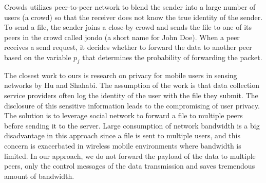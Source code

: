 Crowds\cite{DBLP:journals/cacm/ReiterR99} utilizes peer-to-peer network
to blend the sender into a large number of users (a crowd) so that the
receiver does not know the true identity of the sender.
To send a file, the sender joins a close-by crowd and sends the file to
one of its peers in the crowd called jondo (a short name for John Doe).
When a peer receives a send request, it decides whether to forward the
data to another peer based on the variable $p_f$ that determines the
probability of forwarding the packet.

The closest work to ours is research on privacy for mobile users in sensing
networks \cite{DBLP:conf/percom/HuS10} by Hu and Shahabi. The assumption of the
work is that data collection service providers often log the identity of the
user with the file they submit. The disclosure of this sensitive information
leads to the compromising of user privacy. The solution is to leverage
social network to forward a file to multiple peers before sending it to
the server. Large consumption of network bandwidth is a big disadvantage in
this approach since a file is sent to multiple users, and this concern is
exacerbated in wireless mobile environments where bandwidth is limited.
In our approach, we do not forward the payload of the data to multiple peers,
only the control messages of the data transmission and saves tremendous amount
of bandwidth.